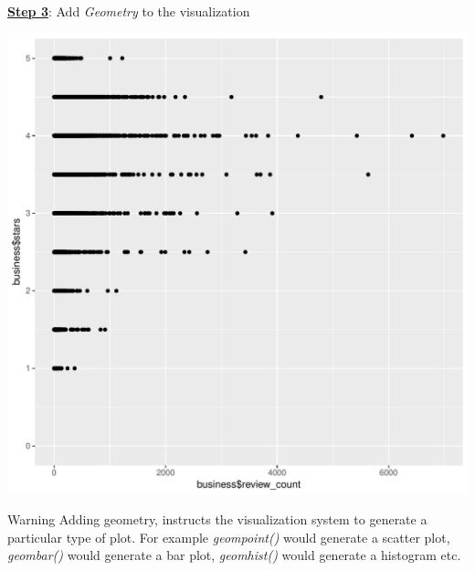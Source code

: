 \documentclass[12pt]{book}\usepackage{knitr}
\begin{document}
\newpage
\noindent \textbf{\Large \underline{Step 3}}: {\Large Add \emph{Geometry} to the visualization} 
\begin{knitrout}
\color{fgcolor}\begin{kframe}
\begin{alltt}
 \hlkwb{<-}  \hlopt{+} \hlstd{()}
\end{alltt}
\end{kframe}
\includegraphics[width=\maxwidth]{figure/add_geometry-1} 

\end{knitrout}

\begin{DIY}{Warning}
\noindent Adding geometry, instructs the visualization system to generate a particular type of plot. For example \emph{geom\textunderscore point()} would generate a scatter plot, \emph{geom\textunderscore bar()} would generate a bar plot,
 \emph{geom\textunderscore hist()} would generate a histogram etc.
\end{DIY}
\end{document}
